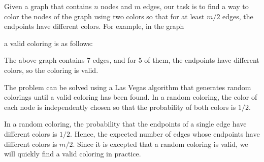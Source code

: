 Given a graph that contains $n$ nodes and $m$ edges,
our task is to find a way to color the nodes
of the graph using two colors so that
for at least $m/2$ edges, the endpoints 
have different colors.
For example, in the graph
\begin{center}
\end{center}
a valid coloring is as follows:
\begin{center}
\end{center}
The above graph contains 7 edges, and for 5 of them,
the endpoints have different colors,
so the coloring is valid.

The problem can be solved using a Las Vegas algorithm
that generates random colorings until a valid coloring
has been found.
In a random coloring, the color of each node is
independently chosen so that the probability of
both colors is $1/2$.

In a random coloring, the probability that the endpoints
of a single edge have different colors is $1/2$.
Hence, the expected number of edges whose endpoints
have different colors is $m/2$.
Since it is excepted that a random coloring is valid,
we will quickly find a valid coloring in practice.


